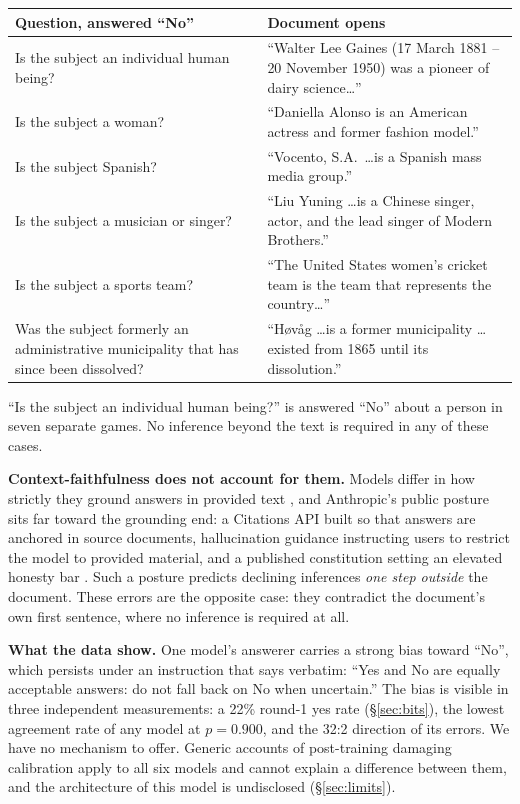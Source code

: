 \documentclass[11pt]{article}
\begin{document}
\begin{center}\small
\begin{tabular}{p{5.2cm}p{7.2cm}}
\toprule
Question, answered ``No'' & Document opens \\
\midrule
Is the subject an individual human being? &
  ``Walter Lee Gaines (17 March 1881 -- 20 November 1950) was a pioneer of dairy
  science\dots'' \\
Is the subject a woman? &
  ``Daniella Alonso is an American actress and former fashion model.'' \\
Is the subject Spanish? &
  ``Vocento, S.A.\ \dots is a Spanish mass media group.'' \\
Is the subject a musician or singer? &
  ``Liu Yuning \dots is a Chinese singer, actor, and the lead singer of Modern
  Brothers.'' \\
Is the subject a sports team? &
  ``The United States women's cricket team is the team that represents the
  country\dots'' \\
Was the subject formerly an administrative municipality that has since been
  dissolved? &
  ``H\o v\aa g \dots is a former municipality \dots existed from 1865 until its
  dissolution.'' \\
\bottomrule
\end{tabular}
\end{center}

``Is the subject an individual human being?'' is answered ``No'' about a person
in seven separate games. No inference beyond the text is required in any of
these cases.

\textbf{Context-faithfulness does not account for them.} Models differ in how
strictly they ground answers in provided text
\citep{longpre2021,xie2024conflict}, and Anthropic's public posture sits far
toward the grounding end: a Citations API built so that answers are anchored in
source documents, hallucination guidance instructing users to restrict the model
to provided material, and a published constitution setting an elevated honesty
bar \citep{bai2022cai}. Such a posture predicts declining inferences \emph{one
step outside} the document. These errors are the opposite case: they contradict
the document's own first sentence, where no inference is required at all.

\textbf{What the data show.} One model's answerer carries a strong bias toward
``No'', which persists under an instruction that says verbatim: ``Yes and No are
equally acceptable answers: do not fall back on No when uncertain.'' The bias is
visible in three independent measurements: a 22\% round-1 yes rate
(\S\ref{sec:bits}), the lowest agreement rate of any model at $p=0.900$, and the
32:2 direction of its errors. We have no mechanism to offer. Generic accounts of
post-training damaging calibration \citep{kadavath2022} apply to all six models
and cannot explain a difference between them, and the architecture of this model
is undisclosed (\S\ref{sec:limits}).
\end{document}
